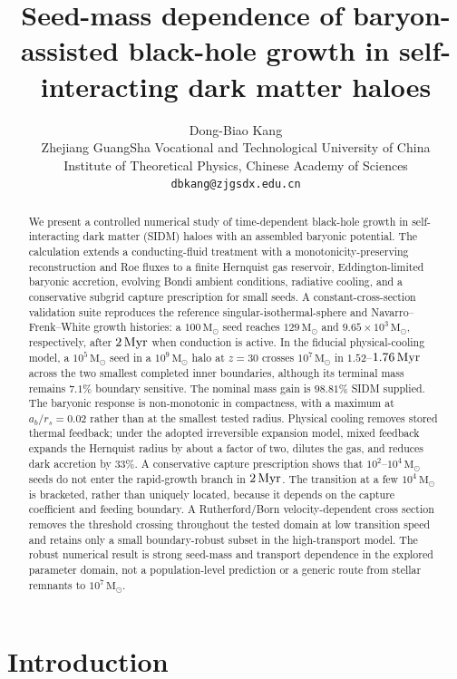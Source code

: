\documentclass[11pt]{article}
\title{Seed-mass dependence of baryon-assisted black-hole growth in self-interacting dark matter haloes}
\author{%
  Dong-Biao Kang\\
  \small Zhejiang GuangSha Vocational and Technological University of China\\
  \small Institute of Theoretical Physics, Chinese Academy of Sciences\\
  \small \texttt{dbkang@zjgsdx.edu.cn}
}
\date{}
\newcommand{\msun}{\,\mathrm{M}_{\odot}}
\begin{document}
\maketitle

\begin{abstract}
We present a controlled numerical study of time-dependent black-hole growth in self-interacting dark matter (SIDM) haloes with an assembled baryonic potential.  The calculation extends a conducting-fluid treatment with a monotonicity-preserving reconstruction and Roe fluxes to a finite Hernquist gas reservoir, Eddington-limited baryonic accretion, evolving Bondi ambient conditions, radiative cooling, and a conservative subgrid capture prescription for small seeds.  A constant-cross-section validation suite reproduces the reference singular-isothermal-sphere and Navarro--Frenk--White growth histories: a $100\msun$ seed reaches $129\msun$ and $9.65\times10^{3}\msun$, respectively, after $2\,{\rm Myr}$ when conduction is active.  In the fiducial physical-cooling model, a $10^{5}\msun$ seed in a $10^{9}\msun$ halo at $z=30$ crosses $10^{7}\msun$ in $1.52$--$1.76\,{\rm Myr}$ across the two smallest completed inner boundaries, although its terminal mass remains $7.1\%$ boundary sensitive.  The nominal mass gain is $98.81\%$ SIDM supplied.  The baryonic response is non-monotonic in compactness, with a maximum at $a_b/r_s=0.02$ rather than at the smallest tested radius.  Physical cooling removes stored thermal feedback; under the adopted irreversible expansion model, mixed feedback expands the Hernquist radius by about a factor of two, dilutes the gas, and reduces dark accretion by $33\%$.  A conservative capture prescription shows that $10^2$--$10^4\msun$ seeds do not enter the rapid-growth branch in $2\,{\rm Myr}$.  The transition at a few $10^4\msun$ is bracketed, rather than uniquely located, because it depends on the capture coefficient and feeding boundary.  A Rutherford/Born velocity-dependent cross section removes the threshold crossing throughout the tested domain at low transition speed and retains only a small boundary-robust subset in the high-transport model.  The robust numerical result is strong seed-mass and transport dependence in the explored parameter domain, not a population-level prediction or a generic route from stellar remnants to $10^{7}\msun$.
\end{abstract}

\section{Introduction}
\end{document}
